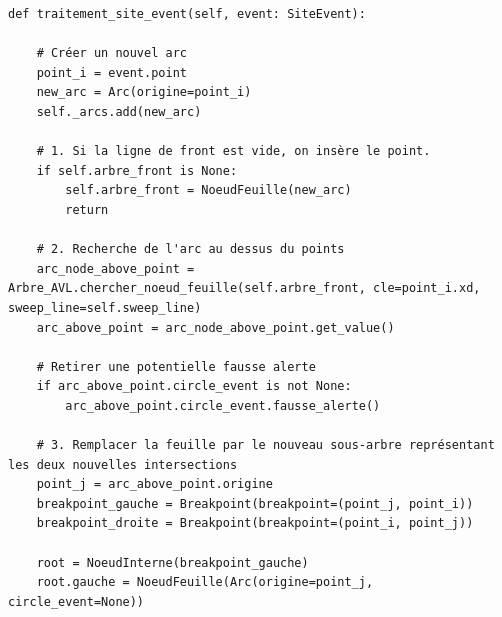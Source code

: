 \begin{frame}[fragile]
\begin{code}
\begin{verbatim}
def traitement_site_event(self, event: SiteEvent):

    # Créer un nouvel arc
    point_i = event.point
    new_arc = Arc(origine=point_i)
    self._arcs.add(new_arc)

    # 1. Si la ligne de front est vide, on insère le point.
    if self.arbre_front is None:
        self.arbre_front = NoeudFeuille(new_arc)
        return

    # 2. Recherche de l'arc au dessus du points
    arc_node_above_point = Arbre_AVL.chercher_noeud_feuille(self.arbre_front, cle=point_i.xd, sweep_line=self.sweep_line)
    arc_above_point = arc_node_above_point.get_value()

    # Retirer une potentielle fausse alerte
    if arc_above_point.circle_event is not None:
        arc_above_point.circle_event.fausse_alerte()

    # 3. Remplacer la feuille par le nouveau sous-arbre représentant les deux nouvelles intersections
    point_j = arc_above_point.origine
    breakpoint_gauche = Breakpoint(breakpoint=(point_j, point_i))
    breakpoint_droite = Breakpoint(breakpoint=(point_i, point_j))

    root = NoeudInterne(breakpoint_gauche)
    root.gauche = NoeudFeuille(Arc(origine=point_j, circle_event=None))
\end{verbatim}
\end{code}
\end{frame}

